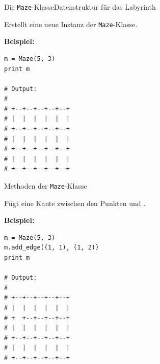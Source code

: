 \documentclass{beamer}
\begin{document}

\begin{frame}[fragile,t]{Die \verb~Maze~-Klasse}{Datenstruktur für das Labyrinth}

\smallskip\noindent
Erstellt eine neue Instanz der \verb~Maze~-Klasse.

\medskip\noindent
\textbf{Beispiel:}

\medskip
\begin{verbatim}
m = Maze(5, 3)
print m

# Output:
#
# +--+--+--+--+--+
# |  |  |  |  |  |
# +--+--+--+--+--+
# |  |  |  |  |  |
# +--+--+--+--+--+
# |  |  |  |  |  |
# +--+--+--+--+--+
\end{verbatim}
\end{frame}

\begin{frame}[fragile,t]{Methoden der \verb~Maze~-Klasse}

\smallskip\noindent
Fügt eine Kante zwischen den Punkten  und .

\medskip\noindent
\textbf{Beispiel:}

\medskip
\begin{verbatim}
m = Maze(5, 3)
m.add_edge((1, 1), (1, 2))
print m

# Output:
#
# +--+--+--+--+--+
# |  |  |  |  |  |
# +  +--+--+--+--+
# |  |  |  |  |  |
# +--+--+--+--+--+
# |  |  |  |  |  |
# +--+--+--+--+--+
\end{verbatim}
\end{frame}
\end{document}
